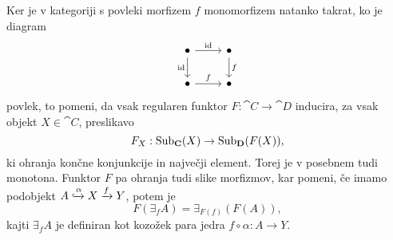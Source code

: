 \documentclass[../kategoricna_logika.tex]{subfiles}
\begin{document}
\begin{dokaz}
Ker je v kategoriji s povleki morfizem $f$ monomorfizem natanko
takrat, ko je diagram
\begin{equation*}
  \begin{tikzcd}
    \bullet \ar[d, "\mathrm{id}"'] \ar[r, "\mathrm{id}"] & \bullet \ar[d, "f"] \\
    \bullet \ar[r, "f"] & \bullet
  \end{tikzcd}
\end{equation*}
povlek, to pomeni, da vsak regularen funktor $F : \cat{C} \to \cat{D}$
inducira, za vsak objekt $X \in \cat{C}$, preslikavo
$$F_X : \operatorname{Sub}_{\operatorname{\mathbf{C}}}(X) \to \operatorname{Sub}_{\operatorname{\mathbf{D}}}(F(X)),$$
ki ohranja končne konjunkcije in največji element. Torej je v posebnem
tudi monotona.  Funktor $F$ pa ohranja tudi slike morfizmov, kar
pomeni, če imamo podobjekt
$A \xhookrightarrow{\alpha} X \xrightarrow{f} Y$, potem je
$$F(\exists_f A) = \exists_{F(f)}(F(A)),$$
kajti $\exists_f A$ je definiran kot kozožek para jedra
$f \circ \alpha : A \to Y$.
\end{dokaz}
%
%
\end{document}
